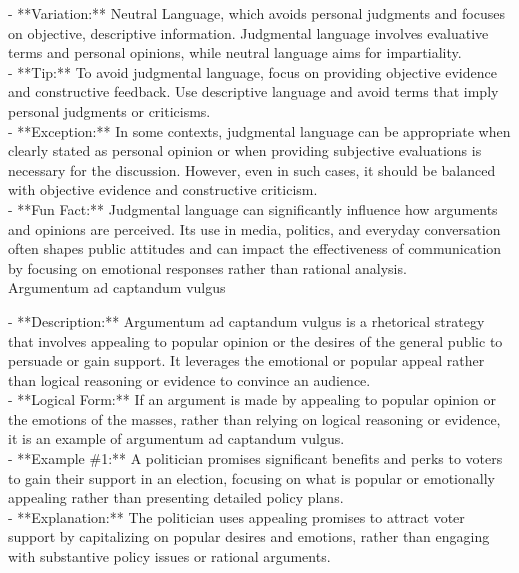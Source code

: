 \documentclass[a4paper,12pt,single,pdftex]{scrartcl}
\begin{document}
    
      - **Variation:** Neutral Language, which avoids personal judgments and focuses on objective, descriptive information. Judgmental language involves evaluative terms and personal opinions, while neutral language aims for impartiality.
    \\

    
      - **Tip:** To avoid judgmental language, focus on providing objective evidence and constructive feedback. Use descriptive language and avoid terms that imply personal judgments or criticisms.
    \\

    
      - **Exception:** In some contexts, judgmental language can be appropriate when clearly stated as personal opinion or when providing subjective evaluations is necessary for the discussion. However, even in such cases, it should be balanced with objective evidence and constructive criticism.
    \\

    
      - **Fun Fact:** Judgmental language can significantly influence how arguments and opinions are perceived. Its use in media, politics, and everyday conversation often shapes public attitudes and can impact the effectiveness of communication by focusing on emotional responses rather than rational analysis.
    \\

  

Argumentum ad captandum vulgus
    
      - **Description:** Argumentum ad captandum vulgus is a rhetorical strategy that involves appealing to popular opinion or the desires of the general public to persuade or gain support. It leverages the emotional or popular appeal rather than logical reasoning or evidence to convince an audience.
    \\

    
      - **Logical Form:** If an argument is made by appealing to popular opinion or the emotions of the masses, rather than relying on logical reasoning or evidence, it is an example of argumentum ad captandum vulgus.
    \\

    
      - **Example \#1:** A politician promises significant benefits and perks to voters to gain their support in an election, focusing on what is popular or emotionally appealing rather than presenting detailed policy plans.
    \\

    
      - **Explanation:** The politician uses appealing promises to attract voter support by capitalizing on popular desires and emotions, rather than engaging with substantive policy issues or rational arguments.
    \\
\end{document}
